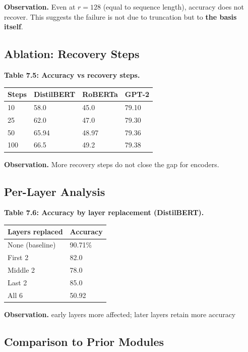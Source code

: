\textbf{Observation.} Even at $r = 128$ (equal to sequence length), accuracy 
does not recover. This suggests the failure is not due to truncation but 
to \textbf{the basis itself}.

\subsection{Ablation: Recovery Steps}

\textbf{Table 7.5: Accuracy vs recovery steps.}

\begin{table}[H]
\centering
\small
\begin{tabular}{llll}
\toprule
\textbf{Steps} & \textbf{DistilBERT} & \textbf{RoBERTa} & \textbf{GPT-2} \\
\midrule
10 & 58.0 & 45.0 & 79.10 \\
25 & 62.0 & 47.0 & 79.30 \\
50 & 65.94 & 48.97 & 79.36 \\
100 & 66.5 & 49.2 & 79.38 \\
\bottomrule
\end{tabular}
\end{table}

\textbf{Observation.} More recovery steps do not close the gap for encoders.

\subsection{Per-Layer Analysis}

\textbf{Table 7.6: Accuracy by layer replacement (DistilBERT).}

\begin{table}[H]
\centering
\small
\begin{tabular}{ll}
\toprule
\textbf{Layers replaced} & \textbf{Accuracy} \\
\midrule
None (baseline) & 90.71\% \\
First 2 & 82.0 \\
Middle 2 & 78.0 \\
Last 2 & 85.0 \\
All 6 & 50.92 \\
\bottomrule
\end{tabular}
\end{table}

\textbf{Observation.} early layers more affected; later layers retain more accuracy

\subsection{Comparison to Prior Modules}

